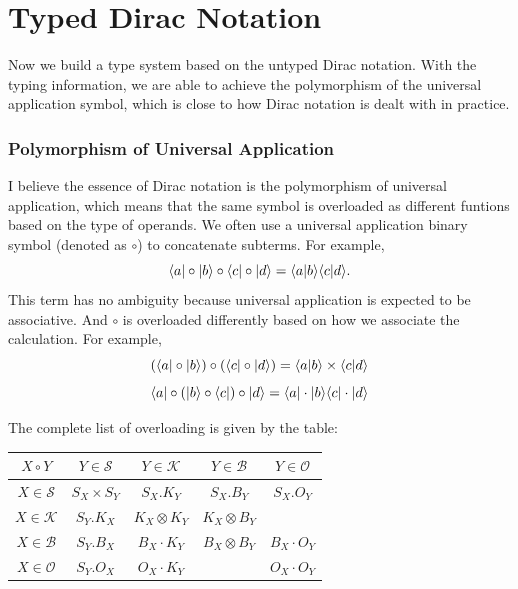 \section{Typed Dirac Notation}

Now we build a type system based on the untyped Dirac notation. With the typing information, we are able to achieve the polymorphism of the universal application symbol, which is close to how Dirac notation is dealt with in practice.

\subsubsection*{Polymorphism of Universal Application}

I believe the essence of Dirac notation is the polymorphism of universal application, which means that the same symbol is overloaded as different funtions based on the type of operands. We often use a universal application binary symbol (denoted as $\circ$) to concatenate subterms. For example, 
$$
\langle a| \circ |b\rangle \circ \langle c| \circ |d\rangle = \langle a | b \rangle \langle c | d \rangle.
$$
This term has no ambiguity because universal application is expected to be associative. And $\circ$ is overloaded differently based on how we associate the calculation. For example,
$$
(\langle a| \circ |b\rangle) \circ (\langle c| \circ |d\rangle) = \langle a | b \rangle \times \langle c | d \rangle
$$
$$
\langle a| \circ (|b\rangle \circ \langle c|) \circ |d\rangle = \langle a | \cdot | b \rangle\langle c | \cdot | d \rangle
$$

The complete list of overloading is given by the table:

\begin{center}
  \begin{tabular}{|c|c|c|c|c|}
    \hline
    $X \circ Y$ & $Y \in \mathcal{S}$ & $Y\in \mathcal{K}$ & $Y \in \mathcal{B}$ & $Y \in \mathcal{O}$ \\
    \hline
    $X \in \mathcal{S}$ & $S_X \times S_Y$ & $S_X.K_Y$ & $S_X.B_Y$ & $S_X.O_Y$ \\
    \hline
    $X \in \mathcal{K}$ & $S_Y.K_X$ & $K_X \otimes K_Y$ & $ K_X \otimes B_Y$ &  \\
    \hline
    $X \in \mathcal{B}$ & $S_Y.B_X$ & $B_X \cdot K_Y$ & $B_X \otimes B_Y$ & $B_X \cdot O_Y$ \\
    \hline
    $X \in \mathcal{O}$ & $S_Y.O_X$ & $O_X \cdot K_Y$ &  & $O_X \cdot O_Y$ \\
    \hline
  \end{tabular}
\end{center}


